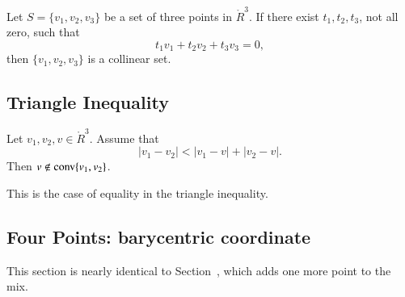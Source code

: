 \begin{tarskidata}
\begin{tarski}

\begin{lemma}
Let $S = \{v_1,v_2,v_3\}$ be a set of three
points in $\ring{R}^3$.  If there exist $t_1,t_2,t_3$, not all zero,
such that  $$
           t_1 v_1 + t_2 v_2 + t_3 v_3 = 0,
           $$
then $\{v_1,v_2,v_3\}$ is a collinear set.
\end{lemma}

\begin{proved}
\swallowed\end{proved}
\end{tarski}









\begin{tarski}
\section{Triangle Inequality}

\begin{lemma} 
Let $v_1,v_2,v\in\ring{R}^3$.  
Assume that
	$$|v_1-v_2| < |v_1-v| + |v_2 - v|.$$
Then $v\not\in{\operatorname{conv}}\{v_1,v_2\}$.
\end{lemma}

\begin{proved}
This is the case of equality in the triangle inequality.
\swallowed\end{proved}
\end{tarski}







\begin{tarski}
\section{Four Points: barycentric coordinate}
This section is nearly identical to Section~, which adds one more point
to the mix.


\end{tarski}
\end{tarskidata}
